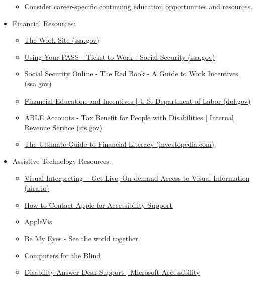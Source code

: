 \begin{itemize}[leftmargin=1.0cm]
\begin{itemize}
		      \item Consider career-specific continuing education opportunities and resources.
	      \end{itemize}
	\item Financial Resources:
	      \begin{itemize}
		      \item \href{https://www.ssa.gov/work/}{The Work Site (ssa.gov)}
		      \item \href{https://www.ssa.gov/redbook/}{Using Your PASS - Ticket to Work - Social Security (ssa.gov)}
		      \item \href{https://www.ssa.gov/redbook/}{Social Security Online - The Red Book - A Guide to Work Incentives (ssa.gov)}
		      \item \href{https://www.irs.gov/government-entities/federal-state-local-governments/able-accounts-tax-benefit-for-people-with-disabilities}{Financial Education and Incentives | U.S. Department of Labor (dol.gov)}
		      \item \href{https://www.irs.gov/government-entities/federal-state-local-governments/able-accounts-tax-benefit-for-people-with-disabilities}{ABLE Accounts - Tax Benefit for People with Disabilities | Internal Revenue Service (irs.gov)}
		      \item \href{https://www.investopedia.com/guide-to-financial-literacy-4800530}{The Ultimate Guide to Financial Literacy (investopedia.com)}
	      \end{itemize}
	\item Assistive Technology Resources:
	      \begin{itemize}
		      \item \href{https://aira.io/#content}{Visual Interpreting – Get Live, On-demand Access to Visual Information (aira.io)}
		      \item \href{https://support.apple.com/en-us/HT209585}{How to Contact Apple for Accessibility Support}
		      \item \href{https://www.applevis.com/}{AppleVis}
		      \item \href{https://www.bemyeyes.com/}{Be My Eyes - See the world together}
		      \item \href{https://www.microsoft.com/en-us/Accessibility/disability-answer-desk?activetab=contact-pivot%3aprimaryr9}{Computers for the Blind}
		      \item \href{https://www.microsoft.com/en-us/Accessibility/disability-answer-desk?activetab=contact-pivot%3aprimaryr9}{Disability Answer Desk Support | Microsoft Accessibility}

\end{itemize}
\end{itemize}
